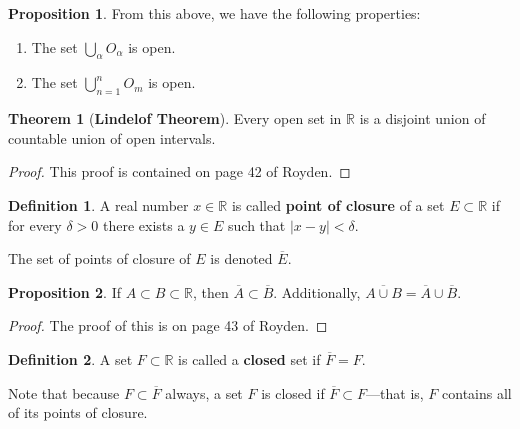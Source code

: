 \documentclass[12pt]{article}
\newcommand{\R}{\mathbb{R}}
\theoremstyle{definition}
\newtheorem*{thm}{Theorem}
\newtheorem*{definition}{Definition}
\newtheorem{prop}{Proposition}
\begin{document}
\begin{prop}
    From this above, we have the following properties:

    \begin{enumerate}
        \item The set \( \displaystyle \bigcup_{\alpha} O_{\alpha} \) is open. 
        \item The set \( \displaystyle \bigcup_{n=1}^{n} O_m \) is open.
    \end{enumerate}
\end{prop}

\begin{thm}[\textbf{Lindelof Theorem}]

    Every open set in \( \R \) is a disjoint union of countable union of open intervals.

        \begin{proof}
            This proof is contained on page 42 of Royden.
        \end{proof}
    
\end{thm}

\begin{definition}
    A real number \( x \in \R \) is called \textbf{point of closure} of a set \( E \subset \R \) if for every \( \delta > 0 \) there exists a \( y \in E \) such that \( |x - y| < \delta \).

    The set of points of closure of \( E \) is denoted \( \overline{E} \).
\end{definition}

\begin{prop}
    If \( A \subset B \subset \R \), then \( \overline{A} \subset \overline{B} \). Additionally, \( \overline{A \cup B } = \overline{A} \cup \overline{B} \).

        \begin{proof}
            The proof of this is on page 43 of Royden.
        \end{proof}
\end{prop}

\begin{definition}
    A set \( F \subset \R \) is called a \textbf{closed} set if \( \overline{F} = F \).
\end{definition}

Note that because \( F  \subset \overline{F} \) always, a set \( F \) is closed if \( \overline{F} \subset F \)---that is, \( F \) contains all of its points of closure.
\end{document}
